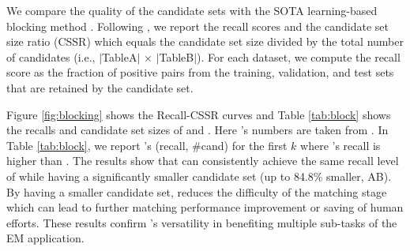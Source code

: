 We compare the quality of the candidate sets with the SOTA learning-based blocking method \dbl.
Following \cite{DBLP:journals/pvldb/ThirumuruganathanLTOGPFD21},
we report the recall scores and the candidate set size ratio (CSSR) which equals the candidate set size
divided by the total number of candidates (i.e., $|$TableA$|$ $\times$ $|$TableB$|$).
For each dataset, we compute the recall score as the fraction
of positive pairs from the training, validation, and test sets 
that are retained by the candidate set.

Figure \ref{fig:blocking} shows the Recall-CSSR curves and
Table \ref{tab:block} shows the recalls and candidate set sizes of \dbl and \system. Here \dbl's numbers 
are taken from \cite{DBLP:journals/pvldb/ThirumuruganathanLTOGPFD21}.
In Table \ref{tab:block}, 
we report \system's (recall, \#cand) for the first $k$ where 
\system's recall is higher than \dbl.
The results show that \system can consistently achieve the same recall level of \dbl while
having a significantly smaller candidate set (up to 84.8\% smaller, AB).
By having a smaller candidate set, \system reduces the difficulty of the matching stage 
which can lead to further 
matching performance improvement or 
saving of human efforts.
These results confirm \system's versatility in
benefiting multiple sub-tasks of the EM application.


\setlength{\tabcolsep}{2.3pt}
\begin{table}[ht]
\small
	\caption{\system for blocking. We report the recall score (R) and the number of candidates pairs (\#cand).}\label{tab:block}
\vspace{-6mm}
\end{table}













